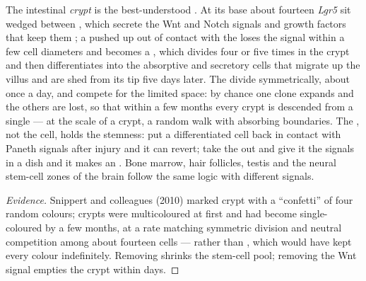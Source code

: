 \begin{proposition}\label{prop:b3:stem-cells:crypt}
The intestinal \emph{crypt} is the best-understood . At its base
about fourteen \emph{Lgr5}  sit wedged between ,
which secrete the Wnt and Notch signals and growth factors that keep
them ; a  pushed up out of contact with the  loses the signal within a few cell diameters and becomes a
, which divides four or five times in the crypt
and then differentiates into the absorptive and secretory cells that
migrate up the villus and are shed from its tip five days later. The
 divide symmetrically, about once a day, and compete for the
limited  space: by chance one clone expands and the others are
lost, so that within a few months every crypt is descended from a
single  --- \emph{} at the scale of a crypt, a
random walk with absorbing boundaries. The , not the cell, holds
the stemness: put a differentiated cell back in contact with Paneth
signals after injury and it can revert; take the  out and
give it the signals in a dish and it makes an . Bone marrow,
hair follicles, testis and the neural stem-cell zones of the brain
follow the same logic with different signals.
\end{proposition}
\begin{proof}[Evidence]
Snippert and colleagues (2010) marked crypt  with a
``confetti'' of four random colours; crypts were multicoloured at first
and had become single-coloured by a few months, at a rate matching
symmetric division and neutral competition among about fourteen cells
--- rather than , which would have kept every colour
indefinitely. Removing  shrinks the stem-cell pool;
removing the Wnt signal empties the crypt within days.
\end{proof}

